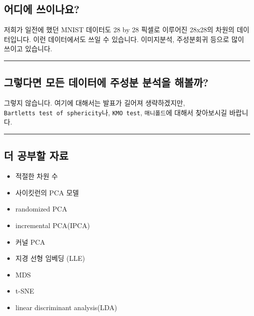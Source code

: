 \documentclass[
]{article}
\providecommand{\tightlist}{%
  \setlength{\itemsep}{0pt}\setlength{\parskip}{0pt}}
\begin{document}
\hypertarget{uxc5b4uxb514uxc5d0-uxc4f0uxc774uxb098uxc694}{%
\subsection{어디에
쓰이나요?}\label{uxc5b4uxb514uxc5d0-uxc4f0uxc774uxb098uxc694}}

저희가 일전에 했던 MNIST 데이터도 28 by 28 픽셀로 이루어진 28x28의
차원의 데이터입니다. 이런 데이터에서도 쓰일 수 있습니다. 이미지분석,
주성분회귀 등으로 많이 쓰이고 있습니다.

\begin{center}\rule{0.5\linewidth}{0.5pt}\end{center}

\hypertarget{uxadf8uxb807uxb2e4uxba74-uxbaa8uxb4e0-uxb370uxc774uxd130uxc5d0-uxc8fcuxc131uxbd84-uxbd84uxc11duxc744-uxd574uxbcfcuxae4c}{%
\subsection{그렇다면 모든 데이터에 주성분 분석을
해볼까?}\label{uxadf8uxb807uxb2e4uxba74-uxbaa8uxb4e0-uxb370uxc774uxd130uxc5d0-uxc8fcuxc131uxbd84-uxbd84uxc11duxc744-uxd574uxbcfcuxae4c}}

그렇지 않습니다. 여기에 대해서는 발표가 길어져 생략하겠지만,
\texttt{Bartlett\textquotesingle{}s\ test\ of\ sphericity}나,
\texttt{KMO\ test}, \texttt{매니폴드}에 대해서 찾아보시길 바랍니다.

\begin{center}\rule{0.5\linewidth}{0.5pt}\end{center}

\hypertarget{uxb354-uxacf5uxbd80uxd560-uxc790uxb8cc}{%
\subsection{더 공부할
자료}\label{uxb354-uxacf5uxbd80uxd560-uxc790uxb8cc}}

\begin{itemize}
\tightlist
\item
  적절한 차원 수
\item
  사이킷런의 PCA 모델
\item
  randomized PCA
\item
  incremental PCA(IPCA)
\item
  커널 PCA
\item
  지경 선형 임베딩 (LLE)
\item
  MDS
\item
  t-SNE
\item
  linear discriminant analysis(LDA)
\end{itemize}
\end{document}
